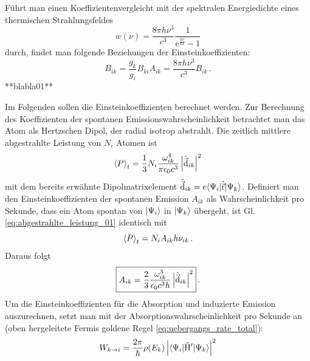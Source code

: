 Führt man einen Koeffizientenvergleicht mit der spektralen
Energiedichte eines thermischen Strahlungsfeldes \cite{demtroeder:ex3}
\begin{equation}\label{eq:spektrale_energiedichte_2}
	w(\nu)=\frac{8\pi h\nu^3}{c^3}\frac{1}{\mathrm{e}^\frac{h\nu}{kT}-1}
\end{equation}
durch, findet man folgende Beziehungen der Einsteinkoeffizienten:
\begin{subequations}\label{eq:einsteinkoeff_relationen}
	\begin{equation}\label{eq:einsteinkoeff_relationen_1}
		B_{ik}=\frac{g_k}{g_i}B_{ki}
	\end{equation}
	\begin{equation}\label{eq:einsteinkoeff_relationen_2}
		A_{ik}=\frac{8\pi h\nu^3}{c^3}B_{ik}\,.
	\end{equation}
\end{subequations}
**blabla01**
\par
Im Folgenden sollen die Einsteinkoeffizienten berechnet werden.
Zur Berechnung des Koeffizienten der spontanen Emissionswahrscheinlichkeit
betrachtet man das Atom als Hertzschen Dipol, der radial isotrop abstrahlt. Die
zeitlich mittlere abgestrahlte Leistung von $N_i$ Atomen
\cite{demtroeder:ex3} ist
\begin{equation}\label{eq:abgestrahlte_leistung_01}
	\left\langle P\right\rangle_t = \frac{1}{3}N_i\frac{\omega_{ik}^4}{\pi\epsilon_0
	c^3}\left|\hat{\vec{\mathrm{d}}}_{ik}\right|^2
\end{equation}
mit dem bereits erwähnte Dipolmatrixelement
$\hat{\vec{\mathrm{d}}}_{ik}=e\langle{\Psi_i}|\hat{\vec{\mathrm{r}}}|{\Psi_k}\rangle$. Definiert man den
Einsteinkoeffizienten der spontanen Emission $A_{ik}$ als Wahrscheinlichkeit pro
Sekunde, dass ein Atom spontan von $|{\Psi_i}\rangle$ in $|{\Psi_k}\rangle$ übergeht,
ist Gl. \eqref{eq:abgestrahlte_leistung_01} identisch mit
\begin{equation}\label{eq:abgestrahlte_leistung_02}
	\left\langle P\right\rangle_t=N_iA_{ik}h\nu_{ik}\,.
\end{equation}
Daraus folgt
\begin{equation}\label{eq:einstein_koeff_A}
	\boxed{
		A_{ik}=\frac{2}{3}\frac{\omega_{ik}^3}{\epsilon_0c^3h}\left|\hat{\vec{\mathrm{d}}}_{ik}\right|^2
	}\,.
\end{equation}
Um die Einsteinkoeffizienten für die Absorption und induzierte Emission
auszurechnen, setzt man mit der Absorptionswahrscheinlichkeit pro Sekunde an
(oben hergeleitete Fermis goldene Regel \eqref{eq:uebergangs_rate_total}):
\begin{equation}\label{eq:w_ki_01}
	W_{k\to i}
	= \frac{2\pi}{\hbar}\rho(E_k)\left|\langle{\Psi_i}|\hat{\mathrm{H}}'|{\Psi_k}\rangle\right|^2
\end{equation}
